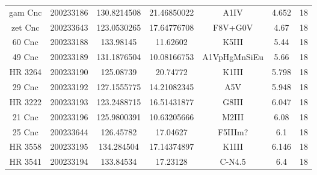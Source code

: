 \begin{table*}
\begin{tabular}{ccccccc}
gam Cnc & 200233186 & 130.8214508 & 21.46850022 & A1IV & 4.652 & 18 \\
zet Cnc & 200233643 & 123.0530265 & 17.64776708 & F8V+G0V & 4.67 & 18 \\
60 Cnc & 200233188 & 133.98145 & 11.62602 & K5III & 5.44 & 18 \\
49 Cnc & 200233189 & 131.1876504 & 10.08166753 & A1VpHgMnSiEu & 5.66 & 18 \\
HR 3264 & 200233190 & 125.08739 & 20.74772 & K1III & 5.798 & 18 \\
29 Cnc & 200233192 & 127.1555775 & 14.21082345 & A5V & 5.948 & 18 \\
HR 3222 & 200233193 & 123.2488715 & 16.51431877 & G8III & 6.047 & 18 \\
21 Cnc & 200233196 & 125.9800391 & 10.63205666 & M2III & 6.08 & 18 \\
25 Cnc & 200233644 & 126.45782 & 17.04627 & F5IIIm? & 6.1 & 18 \\
HR 3558 & 200233195 & 134.284504 & 17.14374897 & K1III & 6.146 & 18 \\
HR 3541 & 200233194 & 133.84534 & 17.23128 & C-N4.5 & 6.4 & 18 \\
\hline
\end{tabular}
\end{table*}
